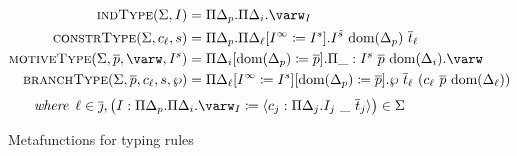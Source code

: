 \begin{figure}
\centering
\begin{align*}
    \indtype{\Sigma}{I} &=
        \Pi \Delta_p . \Pi \Delta_i . \varw_I \\
    \constrtype{\Sigma}{c_\ell}{s} &=
        \Pi \Delta_p . \Pi \Delta_\ell [I^\infty \coloneqq I^s] . I^{\hat{s}}\ \dom{\Delta_p}\ \overline{t}_\ell \\
    \motivetype{\Sigma}{\overline{p}}{\varw}{I^s} &=
        \Pi \Delta_i[\dom{\Delta_p} \coloneqq \overline{p}] . \Pi \_ : I^s\ \overline{p}\ \dom{\Delta_i} . \varw \\
    \branchtype{\Sigma}{\overline{p}}{c_\ell}{s}{\wp} &=
        \Pi \Delta_\ell [I^\infty \coloneqq I^s][\dom{\Delta_p} \coloneqq \overline{p}] . \wp\ \overline{t}_\ell\ (c_\ell\ \overline{p}\ \dom{\Delta_\ell})
\end{align*}
\begin{displaymath}
    \textit{where}\;\:
    \ell \in \overline{\jmath},
    \big(I: \Pi\Delta_p . \Pi\Delta_i . \varw_I \coloneqq \langle c_j : \Pi \Delta_j . I_j\ \_\ \overline{t}_j \rangle \big) \in \Sigma
\end{displaymath}
\caption{Metafunctions for typing rules}
\label{fig:simpl-metafunctions}
\end{figure}

